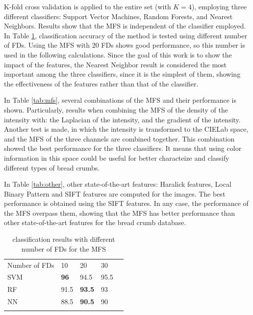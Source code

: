 K-fold cross validation is applied to the entire set (with $K=4$), employing three different classifiers: Support Vector Machines, Random Forests, and Nearest Neighbors. Results show that the MFS is independent of the classifier employed. In Table \ref{tab:number}, classification accuracy of the method is tested using different number of FDs. Using the MFS with $20$ FDs shows good performance, so this number is used in the following calculations. Since the goal of this work is to show the impact of the features, the Nearest Neighbor result is considered the most important among the three classifiers, since it is the simplest of them, showing the effectiveness of the features rather than that of the classifier.

In Table \ref{tab:mfs}, several combinations of the MFS and their performance is shown. Particularly, results when combining the MFS of the density of the intensity with: the Laplacian of the intensity, and the gradient of the intensity. Another test is made, in which the intensity is transformed to the CIELab space, and the MFS of the three channels are combined together. This combination showed the best performance for the three classifiers. It means that using color information in this space could be useful for better characteize and classify different types of bread crumbs.

In Table \ref{tab:other}, other state-of-the-art features: Haralick features, Local Binary Pattern and SIFT features are computed for the images. The best performance is obtained using the SIFT features. In any case, the performance of the MFS overpass them, showing that the MFS has better performance than other state-of-the-art features for the bread crumb database.

\begin{table}
\caption{classification results with different number of FDs for the MFS}
\label{tab:number}       %
\begin{tabular}{lllll}
\hline\noalign{\smallskip}
Number of FDs & 10  & 20 & 30 \\
\noalign{\smallskip}\hline\noalign{\smallskip}
SVM & \textbf{96} & 94.5 & 95.5 \\
RF  & 91.5 & \textbf{93.5} & 93 \\
NN & 88.5 & \textbf{90.5} & 90 \\
\noalign{\smallskip}\hline
\end{tabular}
\end{table}


